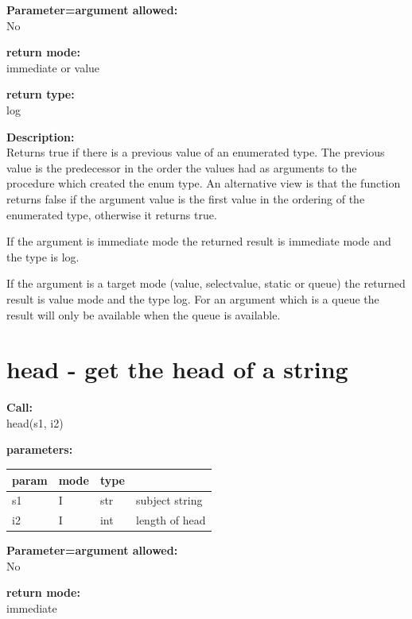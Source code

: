         {\bf Parameter=argument allowed:} \\
        No
        
        {\bf return mode:} \\
        immediate or value

        {\bf return type:} \\
        log
        
        {\bf Description:} \\
        Returns true if there is a previous value of an enumerated type. The
        previous value is the predecessor in the order the values had as
        arguments to the procedure which created the enum type. An alternative
        view is that the function returns false if the argument value is the
        first value in the ordering of the enumerated type, otherwise it
        returns true.
        
        If the argument is immediate mode the returned result is immediate
        mode and the type is log.
        
        If the argument is a target mode (value, selectvalue, static or queue)
        the returned result is value mode and the type log. For an argument
        which is a queue the result will only be available when the queue is
        available.

       

    \section{head - get the head of a string}\label{sec:ifhead}
        
        {\bf Call:} \\
        head(s1, i2)
        
        {\bf parameters:} \\
        \begin{tabular}{| l | l | l | l |}
        \hline
        param  & mode & type & \\
        \hline \hline
        s1 & I & str & subject string   \\ \hline
        i2 & I & int & length of head   \\ \hline
        \end{tabular}
        
        {\bf Parameter=argument allowed:} \\
        No
        
        {\bf return mode:} \\
        immediate

